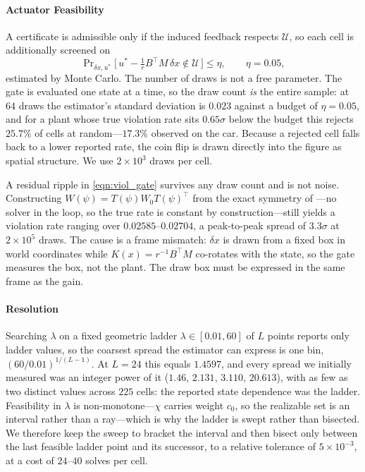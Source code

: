 \documentclass[lettersize,journal]{IEEEtran}
\begin{document}
\paragraph{Actuator Feasibility}
A certificate is admissible only if the induced feedback respects
$\mathcal{U}$, so each cell is additionally screened on
\begin{equation}\label{eqn:viol_gate}
    \Pr\nolimits_{\delta x,u^*}\bigl[\,u^* - \tfrac{1}{r}B^\top M\,\delta x \notin \mathcal{U}\,\bigr] \le \eta,
    \qquad \eta = 0.05,
\end{equation}
estimated by Monte Carlo. The number of draws is not a free parameter. The gate
is evaluated one state at a time, so the draw count \emph{is} the entire sample:
at $64$ draws the estimator's standard deviation is $0.023$ against a budget of
$\eta=0.05$, and for a plant whose true violation rate sits $0.65\sigma$ below
the budget this rejects $25.7\%$ of cells at random---$17.3\%$ observed on the
car. Because a rejected cell falls back to a lower reported rate, the coin flip
is drawn directly into the figure as spatial structure. We use $2\times10^3$
draws per cell.

A residual ripple in \eqref{eqn:viol_gate} survives any draw count and is not
noise. Constructing $W(\psi)=T(\psi)W_0T(\psi)^\top$ from the exact symmetry of
---no solver in the loop, so the true rate is
constant by construction---still yields a violation rate ranging over
$0.02585$--$0.02704$, a peak-to-peak spread of $3.3\sigma$ at $2\times10^5$
draws. The cause is a frame mismatch: $\delta x$ is drawn from a fixed
box in world coordinates while $K(x)=r^{-1}B^\top M$ co-rotates with the state,
so the gate measures the box, not the plant. The draw box must be expressed in
the same frame as the gain.

\paragraph{Resolution}
Searching $\lambda$ on a fixed geometric ladder $\lambda\in[0.01,60]$ of $L$
points reports only ladder values, so the coarsest spread the estimator can
express is one bin, $(60/0.01)^{1/(L-1)}$. At $L=24$ this equals $1.4597$, and
every spread we initially measured was an integer power of it ($1.46$, $2.131$,
$3.110$, $20.613$), with as few as two distinct values across $225$ cells: the
reported state dependence was the ladder. Feasibility in $\lambda$ is
non-monotone---$\chi$ carries weight $c_0$, so the realizable set is an interval
rather than a ray---which is why the ladder is swept rather than bisected. We
therefore keep the sweep to bracket the interval and then bisect only between
the last feasible ladder point and its successor, to a relative tolerance of
$5\times10^{-3}$, at a cost of $24$--$40$ solves per cell.
\end{document}

